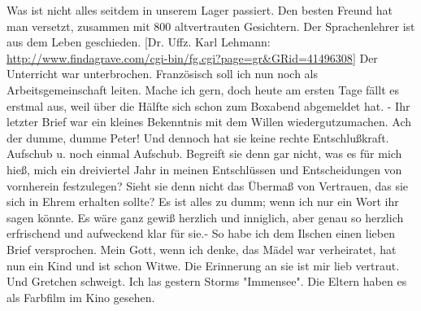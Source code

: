 \def\day{20. September 1944}
\mktitle

Was ist nicht alles seitdem in unserem Lager passiert.
Den besten Freund hat man versetzt, zusammen mit 800 altvertrauten Gesichtern.
Der Sprachenlehrer ist aus dem Leben geschieden. {\color{red} [Dr. Uffz. Karl Lehmann: \url{http://www.findagrave.com/cgi-bin/fg.cgi?page=gr&GRid=41496308}] }
Der Unterricht war unterbrochen.
Franz\"{o}sisch soll ich nun noch als Arbeitsgemeinschaft leiten.
Mache ich gern, doch heute am ersten Tage f\"{a}llt es erstmal aus, weil \"{u}ber die H\"{a}lfte sich schon zum Boxabend abgemeldet hat. -
Ihr letzter Brief war ein kleines Bekenntnis mit dem Willen wiedergutzumachen.
Ach der dumme, dumme Peter!
Und dennoch hat sie keine rechte Entschlu{\ss}kraft.
Aufschub u. noch einmal Aufschub.
Begreift sie denn gar nicht, was es f\"{u}r mich hie{\ss}, mich ein dreiviertel Jahr in meinen Entschl\"{u}ssen und Entscheidungen von vornherein festzulegen?
Sieht sie denn nicht das \"{U}berma{\ss} von Vertrauen, das sie sich in Ehrem erhalten sollte?
Es ist alles zu dumm; wenn ich nur ein Wort ihr sagen k\"{o}nnte.
Es w\"{a}re ganz gewi{\ss} herzlich und inniglich, aber genau so herzlich erfrischend und aufweckend klar f\"{u}r sie.-
So habe ich dem Ilschen einen lieben Brief versprochen.
Mein Gott, wenn ich denke, das M\"{a}del war verheiratet, hat nun ein Kind und ist schon Witwe.
Die Erinnerung an sie ist mir lieb vertraut.
Und Gretchen schweigt.
Ich las gestern Storms "Immensee".
Die Eltern haben es als Farbfilm im Kino gesehen.

\clearpage
